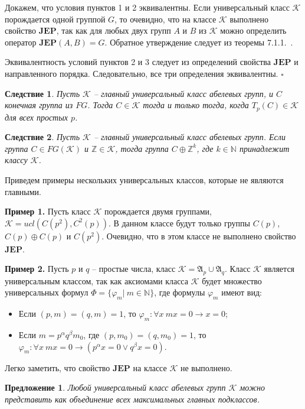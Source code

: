 \documentclass[a4paper,11pt,twoside]{article}
\newtheorem{proposition}{Предложение}[section]
\newtheorem{corollary}{Следствие}[section]
\def\proof{{\noindent{\bf Доказательство.}} }
\def\A{{\mathfrak{A}}}
\def\K{{\mathcal{K}}}
\def\Z{{\mathbb{Z}}}
\def\N{{\mathbb{N}}}
\def\JEP{{\textbf{JEP}}}
\begin{document}
\proof Докажем, что условия пунктов 1 и 2 эквивалентны. Если универсальный класс $\K$ порождается одной группой $G$, то очевидно, что на классе $\K$ выполнено свойство $\JEP$, так как для любых двух групп $A$ и $B$ из $\K$ можно определить оператор $\JEP(A, B) = G$. Обратное утверждение следует из теоремы 7.1.1.~\cite{Hodges}.

Эквивалентность условий пунктов 2 и 3 следует из определений свойства $\JEP$ и направленного порядка. Следовательно, все три определения эквивалентны. $\square$


\begin{corollary}\label{cor:MainClass1}
Пусть $\K$ -- главный универсальный класс абелевых групп, и $C$ конечная группа из $FG$. Тогда $C \in \K$ тогда и только тогда, когда $T_p(C) \in \K$ для всех простых $p$.
\end{corollary}

\begin{corollary}\label{cor:MainClass2}
Пусть $\K$ -- главный универсальный класс абелевых групп. Если группа $C \in FG(\K)$ и $\Z \in \K$, тогда группа $C \oplus \Z^k$, где $k \in \N$ принадлежит классу $\K$.
\end{corollary}

Приведем примеры нескольких универсальных классов, которые не являются главными.

\noindent \textbf{Пример 1.} Пусть класс $\K$ порождается двумя группами, $\K = ucl(C(p^2), C^2(p))$. В данном классе будут только группы $C(p)$, $C(p) \oplus C(p)$ и $C(p^2)$. Очевидно, что в этом классе не выполнено свойство $\JEP$.

\noindent \textbf{Пример 2.} Пусть $p$ и $q$ -- простые числа, класс $\K = \A_p \cup \A_q$. Класс $\K$ является универсальным классом, так как аксиомами класса $\K$ будет множество универсальных формул $\Phi = \{\varphi_m | \ m \in \N\}$, где формулы $\varphi_m$ имеют вид:
\begin{itemize}
 \item Если $(p,m)=(q,m)=1$, то $\varphi_m : \forall x \ mx = 0 \rightarrow x = 0$;
 \item Если $m = p^\alpha q^\beta m_0$, где $(p,m_0)=(q,m_0)=1$, то $\varphi_m : \forall x \ mx = 0 \rightarrow (p^\alpha x = 0 \vee q^\beta x = 0)$.
\end{itemize} 
Легко заметить, что свойство $\JEP$ на классе $\K$ не выполнено.


\begin{proposition}\label{prop:AnyClassIsUnionOfMainClasses}
Любой универсальный класс абелевых групп $\K$ можно представить как объединение всех максимальных главных подклассов.
\end{proposition}
\end{document}
